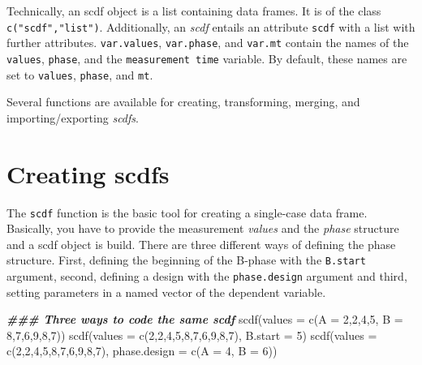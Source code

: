\documentclass[
]{book}
\makeatletter
\newenvironment{Shaded}{\begin{snugshade}}{\end{snugshade}}
\newcommand{\AttributeTok}[1]{\textcolor[rgb]{0.77,0.63,0.00}{#1}}
\newcommand{\DecValTok}[1]{\textcolor[rgb]{0.00,0.00,0.81}{#1}}
\newcommand{\DocumentationTok}[1]{\textcolor[rgb]{0.56,0.35,0.01}{\textbf{\textit{#1}}}}
\newcommand{\FunctionTok}[1]{\textcolor[rgb]{0.00,0.00,0.00}{#1}}
\newcommand{\NormalTok}[1]{#1}
\newenvironment{kframe}{%
\medskip{}
\setlength{\fboxsep}{.8em}
 \def\at@end@of@kframe{}%
 \ifinner\ifhmode%
  \def\at@end@of@kframe{\end{minipage}}%
  \begin{minipage}{\columnwidth}%
 \fi\fi%
 \def\FrameCommand##1{\hskip\@totalleftmargin \hskip-\fboxsep
 \colorbox{shadecolor}{##1}\hskip-\fboxsep
     \hskip-\linewidth \hskip-\@totalleftmargin \hskip\columnwidth}%
 \MakeFramed {\advance\hsize-\width
   \@totalleftmargin\z@ \linewidth\hsize
   \@setminipage}}%
 {\par\unskip\endMakeFramed%
 \at@end@of@kframe}
\newenvironment{rmdblock}[1]
  {
  \begin{itemize}
  \renewcommand{\labelitemi}{
    \raisebox{-.7\height}[0pt][0pt]{
      {\setkeys{Gin}{width=3em,keepaspectratio}\texttt{[image: images/\#1]}}
    }
  }
  \setlength{\fboxsep}{1em}
  \begin{kframe}
  \item
  }
  {
  \end{kframe}
  \end{itemize}
  }
\newenvironment{rmdnote}
  {\begin{rmdblock}{bulp}}
{\end{rmdblock}}
\makeatother
\begin{document}
\begin{rmdnote}
Technically, an scdf object is a list containing data frames. It is of
the class \texttt{c("scdf","list")}. Additionally, an \emph{scdf}
entails an attribute \texttt{scdf} with a list with further attributes.
\texttt{var.values}, \texttt{var.phase}, and \texttt{var.mt} contain the
names of the \texttt{values}, \texttt{phase}, and the
\texttt{measurement\ time} variable. By default, these names are set to
\texttt{values}, \texttt{phase}, and \texttt{mt}.
\end{rmdnote}

Several functions are available for creating, transforming, merging, and importing/exporting \emph{scdfs}.

\hypertarget{creating-scdfs}{%
\section{Creating scdfs}\label{creating-scdfs}}

The \texttt{scdf} function is the basic tool for creating a single-case data frame. Basically, you have to provide the measurement \emph{values} and the \emph{phase} structure and a scdf object is build. There are three different ways of defining the phase structure. First, defining the beginning of the B-phase with the \texttt{B.start} argument, second, defining a design with the \texttt{phase.design} argument and third, setting parameters in a named vector of the dependent variable.

\begin{Shaded}
\begin{Highlighting}[]
\DocumentationTok{\#\#\# Three ways to code the same scdf}
\FunctionTok{scdf}\NormalTok{(}\AttributeTok{values =} \FunctionTok{c}\NormalTok{(}\AttributeTok{A =} \DecValTok{2}\NormalTok{,}\DecValTok{2}\NormalTok{,}\DecValTok{4}\NormalTok{,}\DecValTok{5}\NormalTok{, }\AttributeTok{B =} \DecValTok{8}\NormalTok{,}\DecValTok{7}\NormalTok{,}\DecValTok{6}\NormalTok{,}\DecValTok{9}\NormalTok{,}\DecValTok{8}\NormalTok{,}\DecValTok{7}\NormalTok{))}
\FunctionTok{scdf}\NormalTok{(}\AttributeTok{values =} \FunctionTok{c}\NormalTok{(}\DecValTok{2}\NormalTok{,}\DecValTok{2}\NormalTok{,}\DecValTok{4}\NormalTok{,}\DecValTok{5}\NormalTok{,}\DecValTok{8}\NormalTok{,}\DecValTok{7}\NormalTok{,}\DecValTok{6}\NormalTok{,}\DecValTok{9}\NormalTok{,}\DecValTok{8}\NormalTok{,}\DecValTok{7}\NormalTok{), }\AttributeTok{B.start =} \DecValTok{5}\NormalTok{)}
\FunctionTok{scdf}\NormalTok{(}\AttributeTok{values =} \FunctionTok{c}\NormalTok{(}\DecValTok{2}\NormalTok{,}\DecValTok{2}\NormalTok{,}\DecValTok{4}\NormalTok{,}\DecValTok{5}\NormalTok{,}\DecValTok{8}\NormalTok{,}\DecValTok{7}\NormalTok{,}\DecValTok{6}\NormalTok{,}\DecValTok{9}\NormalTok{,}\DecValTok{8}\NormalTok{,}\DecValTok{7}\NormalTok{), }\AttributeTok{phase.design =} \FunctionTok{c}\NormalTok{(}\AttributeTok{A =} \DecValTok{4}\NormalTok{, }\AttributeTok{B =} \DecValTok{6}\NormalTok{))}
\end{Highlighting}
\end{Shaded}
\end{document}
